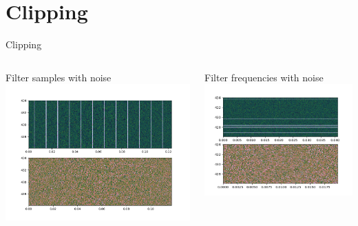 \documentclass{beamer}
\begin{document}
\section{Clipping}
\begin{frame}{Clipping}
	\begin{columns}
		\begin{column}{0.5\textwidth}
			Filter samples with noise
			\includegraphics[width=\columnwidth]{filter_samples}
		\end{column}
		\begin{column}{0.5\textwidth}
			Filter frequencies with noise
			\includegraphics[width=\columnwidth]{filter_freqs}
		\end{column}
	\end{columns}
\end{frame}
\end{document}
